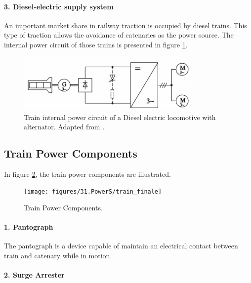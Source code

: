 \paragraph{3. Diesel-electric supply system\\}

An important market share in railway traction is occupied by diesel trains. This type of traction allows the avoidance of catenaries as the power source. The internal power circuit of those trains is presented in figure \ref{fig:steimel2008c}.

\begin{figure}[h!]
	\centering
	\begin{minipage}{.6\textwidth}
		\centering
		\includegraphics[width=0.8\textwidth,keepaspectratio]{figures/31.PowerS/steimel2008c}
		\caption{Train internal power circuit of a Diesel electric locomotive with alternator. Adapted from \cite{steimel2008}.}
		\label{fig:steimel2008c}
	\end{minipage}
\end{figure}


\subsection{Train Power Components}
\label{subs:314}

In figure \ref{fig:train_finale}, the train power components are illustrated.

\begin{figure}[h!]
	\centering
	\texttt{[image: figures/31.PowerS/train\_finale]}
	\caption{Train Power Components.}
	\label{fig:train_finale}
\end{figure}

\paragraph{1. Pantograph\\}

	The pantograph is a device capable of maintain an electrical contact between train and catenary while in motion.
	
\paragraph{2. Surge Arrester\\}

